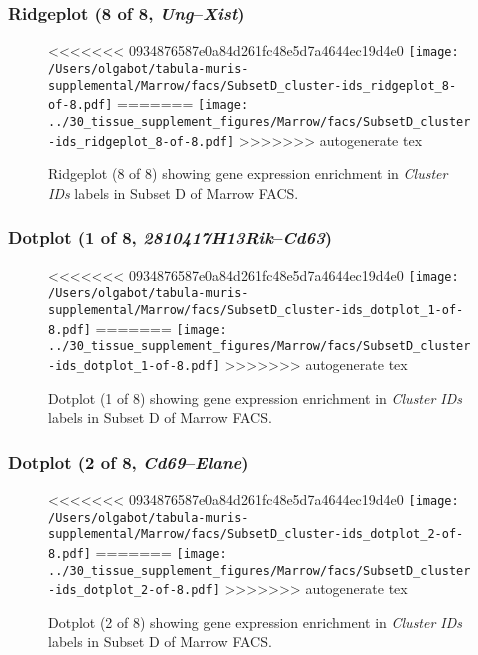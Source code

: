 \clearpage

\subsubsection{Ridgeplot (8 of 8, \emph{Ung}--\emph{Xist})}
\begin{figure}[h]
\centering
<<<<<<< 0934876587e0a84d261fc48e5d7a4644ec19d4e0
\texttt{[image: /Users/olgabot/tabula-muris-supplemental/Marrow/facs/SubsetD\_cluster-ids\_ridgeplot\_8-of-8.pdf]}
=======
\texttt{[image: ../30\_tissue\_supplement\_figures/Marrow/facs/SubsetD\_cluster-ids\_ridgeplot\_8-of-8.pdf]}
>>>>>>> autogenerate tex

\caption{ Ridgeplot (8 of 8)  showing gene expression enrichment in \emph{Cluster IDs} labels in Subset D of Marrow FACS. }
\end{figure}


\clearpage

\subsubsection{Dotplot (1 of 8, \emph{2810417H13Rik}--\emph{Cd63})}
\begin{figure}[h]
\centering
<<<<<<< 0934876587e0a84d261fc48e5d7a4644ec19d4e0
\texttt{[image: /Users/olgabot/tabula-muris-supplemental/Marrow/facs/SubsetD\_cluster-ids\_dotplot\_1-of-8.pdf]}
=======
\texttt{[image: ../30\_tissue\_supplement\_figures/Marrow/facs/SubsetD\_cluster-ids\_dotplot\_1-of-8.pdf]}
>>>>>>> autogenerate tex

\caption{ Dotplot (1 of 8)  showing gene expression enrichment in \emph{Cluster IDs} labels in Subset D of Marrow FACS. }
\end{figure}


\clearpage

\subsubsection{Dotplot (2 of 8, \emph{Cd69}--\emph{Elane})}
\begin{figure}[h]
\centering
<<<<<<< 0934876587e0a84d261fc48e5d7a4644ec19d4e0
\texttt{[image: /Users/olgabot/tabula-muris-supplemental/Marrow/facs/SubsetD\_cluster-ids\_dotplot\_2-of-8.pdf]}
=======
\texttt{[image: ../30\_tissue\_supplement\_figures/Marrow/facs/SubsetD\_cluster-ids\_dotplot\_2-of-8.pdf]}
>>>>>>> autogenerate tex

\caption{ Dotplot (2 of 8)  showing gene expression enrichment in \emph{Cluster IDs} labels in Subset D of Marrow FACS. }
\end{figure}



